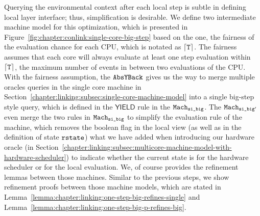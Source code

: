 Querying the environmental context after each local step is subtle in defining local layer interface;
thus, simplification is desirable. 
We define two intermediate machine model for this optimization,
which is presented in Figure~\ref{fig:chapter:conlink:single-core-big-step} based on the one, the fairness of the evaluation chance for each CPU, which is notated as ${\lceil{{\mathrm{\texttt{T}}}}\rceil}$. 
The fairness assumes that each core will always evaluate at least one step evaluation within 
${\lceil{{\mathrm{\texttt{T}}}}\rceil}$,  the maximum number
of events in between two evaluations of the CPU.
With the fairness assumption, 
the ${{\mathrm{\texttt{AbsYBack}}}}$ gives us the way to merge multiple oracles queries in
the single core machine in Section~\ref{chapter:linking:subsec:single-core-machine-model} 
into a single big-step style query,
which is defined in the $\textsf{YIELD}$ rule in the ${{{\mathrm{\texttt{Mach}}}}_{{\mathrm{\texttt{si\_big}}}}}$.
The ${{{\mathrm{\texttt{Mach}}}}_{{\mathrm{\texttt{si\_big}}}'}}$ even merge the two rules in  ${{{\mathrm{\texttt{Mach}}}}_{{\mathrm{\texttt{si\_big}}}}}$ to simplify 
the evaluation rule of the machine, which removes the boolean flag in the local view (as well as in  the definition of state ${{\mathrm{\texttt{rstate}}}}$) 
what we have added when introducing our hardware oracle (in Section~\ref{chapter:linking:subsec:multicore-machine-model-with-hardware-scheduler}) to indicate whether the current state is for the hardware scheduler or for the local evaluation.
We, of course provides the refinement lemmas between those machines.
Similar to the previous steps, 
we show  refinement proofs between those machine models,
which are stated in Lemma~\ref{lemma:chapter:linking:one-step-big-refines-single} and Lemma~\ref{lemma:chapter:linking:one-step-big-p-refines-big}.
%
%
%

